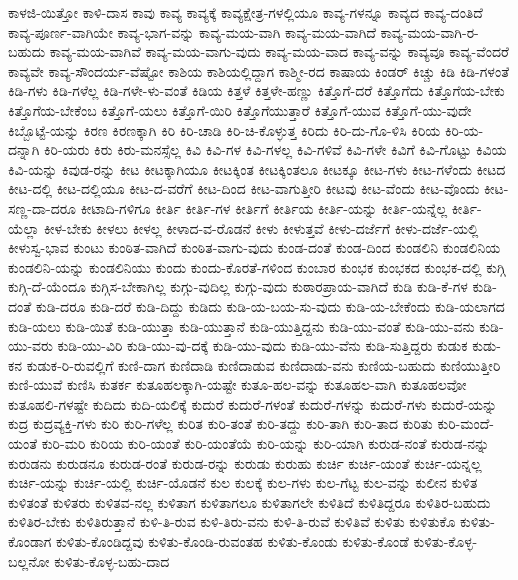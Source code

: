 {ಕಾಳಜಿ-ಯಿತ್ತೋ
ಕಾಳಿ-ದಾಸ
ಕಾವು
ಕಾವ್ಯ
ಕಾವ್ಯಕ್ಕೆ
ಕಾವ್ಯಕ್ಷೇತ್ರ-ಗಳಲ್ಲಿಯೂ
ಕಾವ್ಯ-ಗಳನ್ನೂ
ಕಾವ್ಯದ
ಕಾವ್ಯ-ದಂತಿದೆ
ಕಾವ್ಯ-ಪೂರ್ಣ-ವಾಗಿಯೇ
ಕಾವ್ಯ-ಭಾಗ-ವನ್ನು
ಕಾವ್ಯ-ಮಯ-ವಾಗಿ
ಕಾವ್ಯ-ಮಯ-ವಾಗಿದೆ
ಕಾವ್ಯ-ಮಯ-ವಾಗಿ-ರ-ಬಹುದು
ಕಾವ್ಯ-ಮಯ-ವಾಗಿವೆ
ಕಾವ್ಯ-ಮಯ-ವಾಗು-ವುದು
ಕಾವ್ಯ-ಮಯ-ವಾದ
ಕಾವ್ಯ-ವನ್ನು
ಕಾವ್ಯವೂ
ಕಾವ್ಯ-ವೆಂದರೆ
ಕಾವ್ಯವೇ
ಕಾವ್ಯ-ಸೌಂದರ್ಯ-ವೆಷ್ಟೋ
ಕಾಶಿಯ
ಕಾಶಿಯಲ್ಲಿದ್ದಾಗ
ಕಾಶ್ಮೀ-ರದ
ಕಾಷಾಯ
ಕಿಂಡರ್
ಕಿಚ್ಚು
ಕಿಡಿ
ಕಿಡಿ-ಗಳಂತೆ
ಕಿಡಿ-ಗಳು
ಕಿಡಿ-ಗಳೆಲ್ಲ
ಕಿಡಿ-ಗಳೇ-ಳು-ವಂತೆ
ಕಿಡಿಯ
ಕಿತ್ತಳೆ
ಕಿತ್ತಳೇ-ಹಣ್ಣು
ಕಿತ್ತೊಗೆ-ದರೆ
ಕಿತ್ತೊಗೆದು
ಕಿತ್ತೊಗೆಯ-ಬೇಕು
ಕಿತ್ತೊಗೆಯ-ಬೇಕೆಂಬ
ಕಿತ್ತೊಗೆ-ಯಲು
ಕಿತ್ತೊಗೆ-ಯಿರಿ
ಕಿತ್ತೊಗೆಯುತ್ತಾರೆ
ಕಿತ್ತೊಗೆ-ಯುವ
ಕಿತ್ತೊಗೆ-ಯು-ವುದೇ
ಕಿಬ್ಬೊಟ್ಟೆ-ಯನ್ನು
ಕಿರಣ
ಕಿರಣಕ್ಕಾಗಿ
ಕಿರಿ
ಕಿರಿ-ಚಾಡಿ
ಕಿರಿ-ಚಿ-ಕೊಳ್ಳುತ್ತ
ಕಿರಿದು
ಕಿರಿ-ದು-ಗೊ-ಳಿಸಿ
ಕಿರಿಯ
ಕಿರಿ-ಯ-ದನ್ನಾಗಿ
ಕಿರಿ-ಯರು
ಕಿರು
ಕಿರು-ಮನಸ್ಸೆಲ್ಲ
ಕಿವಿ
ಕಿವಿ-ಗಳ
ಕಿವಿ-ಗಳಲ್ಲ
ಕಿವಿ-ಗಳಿವೆ
ಕಿವಿ-ಗಳೇ
ಕಿವಿಗೆ
ಕಿವಿ-ಗೊಟ್ಟು
ಕಿವಿಯ
ಕಿವಿ-ಯನ್ನು
ಕಿವುಡ-ರನ್ನು
ಕೀಟ
ಕೀಟಕ್ಕಾಗಿಯೂ
ಕೀಟಕ್ಕಿಂತ
ಕೀಟಕ್ಕಿಂತಲೂ
ಕೀಟಕ್ಕೂ
ಕೀಟ-ಗಳು
ಕೀಟ-ಗಳೆಂದು
ಕೀಟದ
ಕೀಟ-ದಲ್ಲಿ
ಕೀಟ-ದಲ್ಲಿಯೂ
ಕೀಟ-ದ-ವರೆಗೆ
ಕೀಟ-ದಿಂದ
ಕೀಟ-ವಾಗುತ್ತೀರಿ
ಕೀಟವು
ಕೀಟ-ವೆಂದು
ಕೀಟ-ವೊಂದು
ಕೀಟ-ಸಣ್ಣ-ದಾ-ದರೂ
ಕೀಟಾದಿ-ಗಳಿಗೂ
ಕೀರ್ತಿ
ಕೀರ್ತಿ-ಗಳ
ಕೀರ್ತಿಗೆ
ಕೀರ್ತಿಯ
ಕೀರ್ತಿ-ಯನ್ನು
ಕೀರ್ತಿ-ಯನ್ನೆಲ್ಲ
ಕೀರ್ತಿ-ಯೆಲ್ಲಾ
ಕೀಳ-ಬೇಕು
ಕೀಳಲು
ಕೀಳಲ್ಲ
ಕೀಳಾದ-ವ-ರೊಡನೆ
ಕೀಳು
ಕೀಳುತ್ತವೆ
ಕೀಳು-ದರ್ಜೆಗೆ
ಕೀಳು-ದರ್ಜೆ-ಯಲ್ಲಿ
ಕೀಳುಸ್ವ-ಭಾವ
ಕುಂಟು
ಕುಂಠಿತ-ವಾಗಿದೆ
ಕುಂಠಿತ-ವಾಗು-ವುದು
ಕುಂಡ-ದಂತೆ
ಕುಂಡ-ದಿಂದ
ಕುಂಡಲಿನಿ
ಕುಂಡಲಿನಿಯ
ಕುಂಡಲಿನಿ-ಯನ್ನು
ಕುಂಡಲಿನಿಯು
ಕುಂದು
ಕುಂದು-ಕೊರತೆ-ಗಳಿಂದ
ಕುಂಬಾರ
ಕುಂಭಕ
ಕುಂಭಕದ
ಕುಂಭಕ-ದಲ್ಲಿ
ಕುಗ್ಗಿ
ಕುಗ್ಗಿ-ದೆ-ಯೆಂದೂ
ಕುಗ್ಗಿಸ-ಬೇಕಾಗಿಲ್ಲ
ಕುಗ್ಗು-ವುದಿಲ್ಲ
ಕುಗ್ಗು-ವುದು
ಕುಠಾರಪ್ರಾಯ-ವಾಗಿದೆ
ಕುಡಿ
ಕುಡಿ-ಕೆ-ಗಳ
ಕುಡಿ-ದಂತೆ
ಕುಡಿ-ದರೂ
ಕುಡಿ-ದರೆ
ಕುಡಿ-ದಿದ್ದು
ಕುಡಿದು
ಕುಡಿ-ಯ-ಬಯ-ಸು-ವುದು
ಕುಡಿ-ಯ-ಬೇಕೆಂದು
ಕುಡಿ-ಯಲಾಗದ
ಕುಡಿ-ಯಲು
ಕುಡಿ-ಯಿತೆ
ಕುಡಿ-ಯುತ್ತಾ
ಕುಡಿ-ಯುತ್ತಾನೆ
ಕುಡಿ-ಯುತ್ತಿದ್ದನು
ಕುಡಿ-ಯು-ವಂತೆ
ಕುಡಿ-ಯು-ವನು
ಕುಡಿ-ಯು-ವರು
ಕುಡಿ-ಯು-ವಿರಿ
ಕುಡಿ-ಯು-ವು-ದಕ್ಕೆ
ಕುಡಿ-ಯು-ವುದು
ಕುಡಿ-ಯು-ವೆನು
ಕುಡಿ-ಸುತ್ತಿದ್ದರು
ಕುಡುಕ
ಕುಡು-ಕನ
ಕುಡುಕ-ರಿ-ರುವಲ್ಲಿಗೆ
ಕುಣಿ-ದಾಗ
ಕುಣಿದಾಡಿ
ಕುಣಿದಾಡುವ
ಕುಣಿದಾಡು-ವನು
ಕುಣಿಯ-ಬಹುದು
ಕುಣಿಯುತ್ತೀರಿ
ಕುಣಿ-ಯುವೆ
ಕುಣಿಸಿ
ಕುತರ್ಕ
ಕುತೂಹಲಕ್ಕಾಗಿ-ಯಷ್ಟೇ
ಕುತೂ-ಹಲ-ವನ್ನು
ಕುತೂಹಲ-ವಾಗಿ
ಕುತೂಹಲವೋ
ಕುತೂಹಲಿ-ಗಳಷ್ಟೇ
ಕುದಿದು
ಕುದಿ-ಯಲಿಕ್ಕೆ
ಕುದುರೆ
ಕುದುರೆ-ಗಳಂತೆ
ಕುದುರೆ-ಗಳನ್ನು
ಕುದುರೆ-ಗಳು
ಕುದುರೆ-ಯನ್ನು
ಕುದ್ರ
ಕುದ್ರವ್ಯಕ್ತಿ-ಗಳು
ಕುರಿ
ಕುರಿ-ಗಳೆಲ್ಲ
ಕುರಿತ
ಕುರಿ-ತಂತೆ
ಕುರಿ-ತದ್ದು
ಕುರಿ-ತಾಗಿ
ಕುರಿ-ತಾದ
ಕುರಿತು
ಕುರಿ-ಮಂದೆ-ಯಂತೆ
ಕುರಿ-ಮರಿ
ಕುರಿಯ
ಕುರಿ-ಯಂತೆ
ಕುರಿ-ಯಂತೆಯೆ
ಕುರಿ-ಯನ್ನು
ಕುರಿ-ಯಾಗಿ
ಕುರುಡ-ನಂತೆ
ಕುರುಡ-ನನ್ನು
ಕುರುಡನು
ಕುರುಡನೂ
ಕುರುಡ-ರಂತೆ
ಕುರುಡ-ರನ್ನು
ಕುರುಡು
ಕುರುಹು
ಕುರ್ಚಿ
ಕುರ್ಚಿ-ಯಂತೆ
ಕುರ್ಚಿ-ಯನ್ನಲ್ಲ
ಕುರ್ಚಿ-ಯನ್ನು
ಕುರ್ಚಿ-ಯಲ್ಲಿ
ಕುರ್ಚಿ-ಯೊಡನೆ
ಕುಲ
ಕುಲಕ್ಕೆ
ಕುಲ-ಗಳು
ಕುಲ-ಗೆಟ್ಟ
ಕುಲ-ವನ್ನು
ಕುಲೀನ
ಕುಳಿತ
ಕುಳಿತಂತೆ
ಕುಳಿತರು
ಕುಳಿತವ-ನಲ್ಲ
ಕುಳಿತಾಗ
ಕುಳಿತಾಗಲೂ
ಕುಳಿತಾಗಲೇ
ಕುಳಿತಿದೆ
ಕುಳಿತಿದ್ದರೂ
ಕುಳಿತಿರ-ಬಹುದು
ಕುಳಿತಿರ-ಬೇಕು
ಕುಳಿತಿರುತ್ತಾನೆ
ಕುಳಿ-ತಿ-ರುವ
ಕುಳಿ-ತಿರು-ವನು
ಕುಳಿ-ತಿ-ರುವೆ
ಕುಳಿತಿವೆ
ಕುಳಿತು
ಕುಳಿತುಕೊ
ಕುಳಿತು-ಕೊಂಡಾಗ
ಕುಳಿತು-ಕೊಂಡಿದ್ದವು
ಕುಳಿತು-ಕೊಂಡಿ-ರುವಂತಹ
ಕುಳಿತು-ಕೊಂಡು
ಕುಳಿತು-ಕೊಂಡೆ
ಕುಳಿತು-ಕೊಳ್ಳ-ಬಲ್ಲನೋ
ಕುಳಿತು-ಕೊಳ್ಳ-ಬಹು-ದಾದ
}
